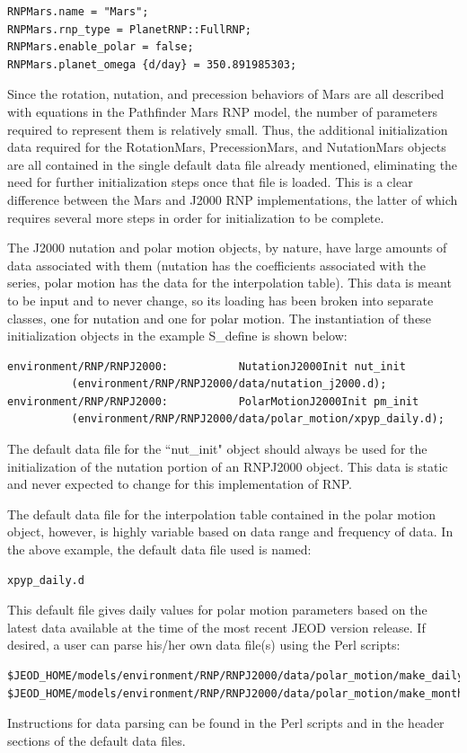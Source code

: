 \begin{verbatim}
RNPMars.name = "Mars";
RNPMars.rnp_type = PlanetRNP::FullRNP;
RNPMars.enable_polar = false;
RNPMars.planet_omega {d/day} = 350.891985303;
\end{verbatim}

Since the rotation, nutation, and precession behaviors of Mars are all
described with equations in the Pathfinder Mars RNP model, the
number of parameters required to represent them is relatively small. Thus, the
additional initialization data required for the RotationMars, PrecessionMars,
and NutationMars objects are all contained in the single default data file
already mentioned, eliminating the need for further initialization steps once
that file is loaded. This is a clear difference between the Mars and J2000 RNP
implementations, the latter of which requires several more steps in order for
initialization to be complete.

The J2000 nutation and polar motion objects, by nature, have large amounts of
data associated with them (nutation has the coefficients associated with the
series, polar motion has the data for the interpolation table). This data
is meant to be input and to never change, so its loading has been broken
into separate classes, one for nutation and one for polar motion. The
instantiation of these initialization objects in the example S\_define is shown
below:

\begin{verbatim}
environment/RNP/RNPJ2000:           NutationJ2000Init nut_init
          (environment/RNP/RNPJ2000/data/nutation_j2000.d);
environment/RNP/RNPJ2000:           PolarMotionJ2000Init pm_init
          (environment/RNP/RNPJ2000/data/polar_motion/xpyp_daily.d);
\end{verbatim}

The default data file for the ``nut\_init" object should always be used for
the initialization of the nutation portion of an RNPJ2000 object. This data
is static and never expected to change for this implementation of RNP.

The default data file for the interpolation table contained in the polar motion
object, however, is highly variable based on data range and frequency of data.
In the above example, the default data file used is named:

\begin{verbatim}
xpyp_daily.d
\end{verbatim}

This default file gives daily values for polar motion parameters based on
the latest data available at the time of the most recent JEOD version release.  
If desired, a user can parse his/her own data file(s) using the Perl scripts:
\begin{verbatim}
$JEOD_HOME/models/environment/RNP/RNPJ2000/data/polar_motion/make_daily_file.pl
$JEOD_HOME/models/environment/RNP/RNPJ2000/data/polar_motion/make_monthly_file.pl
\end{verbatim}
Instructions for data parsing can be found in the Perl scripts
and in the header sections of the default data files.

